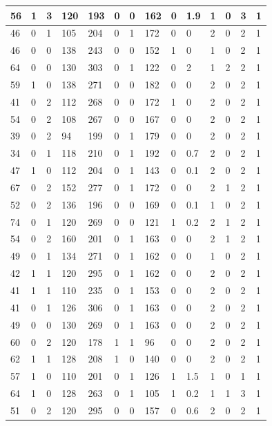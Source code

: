 \documentclass{article}
\begin{document}
\begin{table}[h!]
\begin{tabular}{|l|l|l|l|l|l|l|l|l|l|l|l|l|l|}
56 & 1 & 3 & 120 & 193 & 0 & 0 & 162 & 0 & 1.9 & 1  &0 & 3 & 1 \\ \hline
46 & 0 & 1 & 105 & 204 & 0 & 1 & 172 & 0 & 0 & 2  &0 & 2 & 1 \\ \hline
46 & 0 & 0 & 138 & 243 & 0 & 0 & 152 & 1 & 0 & 1  &0 & 2 & 1 \\ \hline
64 & 0 & 0 & 130 & 303 & 0 & 1 & 122 & 0 & 2 & 1  &2 & 2 & 1 \\ \hline
59 & 1 & 0 & 138 & 271 & 0 & 0 & 182 & 0 & 0 & 2  &0 & 2 & 1 \\ \hline
41 & 0 & 2 & 112 & 268 & 0 & 0 & 172 & 1 & 0 & 2  &0 & 2 & 1 \\ \hline
54 & 0 & 2 & 108 & 267 & 0 & 0 & 167 & 0 & 0 & 2  &0 & 2 & 1 \\ \hline
39 & 0 & 2 & 94 & 199 & 0 & 1 & 179 & 0 & 0 & 2  &0 & 2 & 1 \\ \hline
34 & 0 & 1 & 118 & 210 & 0 & 1 & 192 & 0 & 0.7 & 2  &0 & 2 & 1 \\ \hline
47 & 1 & 0 & 112 & 204 & 0 & 1 & 143 & 0 & 0.1 & 2  &0 & 2 & 1 \\ \hline
67 & 0 & 2 & 152 & 277 & 0 & 1 & 172 & 0 & 0 & 2  &1 & 2 & 1 \\ \hline
52 & 0 & 2 & 136 & 196 & 0 & 0 & 169 & 0 & 0.1 & 1  &0 & 2 & 1 \\ \hline
74 & 0 & 1 & 120 & 269 & 0 & 0 & 121 & 1 & 0.2 & 2  &1 & 2 & 1 \\ \hline
54 & 0 & 2 & 160 & 201 & 0 & 1 & 163 & 0 & 0 & 2  &1 & 2 & 1 \\ \hline
49 & 0 & 1 & 134 & 271 & 0 & 1 & 162 & 0 & 0 & 1  &0 & 2 & 1 \\ \hline
42 & 1 & 1 & 120 & 295 & 0 & 1 & 162 & 0 & 0 & 2  &0 & 2 & 1 \\ \hline
41 & 1 & 1 & 110 & 235 & 0 & 1 & 153 & 0 & 0 & 2  &0 & 2 & 1 \\ \hline
41 & 0 & 1 & 126 & 306 & 0 & 1 & 163 & 0 & 0 & 2  &0 & 2 & 1 \\ \hline
49 & 0 & 0 & 130 & 269 & 0 & 1 & 163 & 0 & 0 & 2  &0 & 2 & 1 \\ \hline
60 & 0 & 2 & 120 & 178 & 1 & 1 & 96 & 0 & 0 & 2  &0 & 2 & 1 \\ \hline
62 & 1 & 1 & 128 & 208 & 1 & 0 & 140 & 0 & 0 & 2  &0 & 2 & 1 \\ \hline
57 & 1 & 0 & 110 & 201 & 0 & 1 & 126 & 1 & 1.5 & 1  &0 & 1 & 1 \\ \hline
64 & 1 & 0 & 128 & 263 & 0 & 1 & 105 & 1 & 0.2 & 1  &1 & 3 & 1 \\ \hline
51 & 0 & 2 & 120 & 295 & 0 & 0 & 157 & 0 & 0.6 & 2  &0 & 2 & 1 \\ \hline

\end{tabular}
\end{table}
\end{document}
